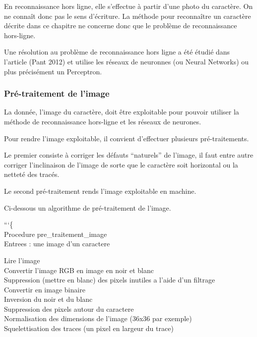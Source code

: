 \documentclass[
12pt,
french,
]{article}
\begin{document}
En reconnaissance hors ligne, elle s'effectue à partir d'une photo du
caractère. On ne connaît donc pas le sens d'écriture. La méthode pour
reconnaître un caractère décrite dans ce chapitre ne concerne donc que
le problème de reconnaissance hors-ligne.

Une résolution au problème de reconnaissance hors ligne a été étudié
dans l'article (Pant 2012) et utilise les réseaux de neuronnes (ou
Neural Networks) ou plus précisément un Perceptron.

\hypertarget{pruxe9-traitement-de-limage}{%
\subsubsection{Pré-traitement de
l'image}\label{pruxe9-traitement-de-limage}}

La donnée, l'image du caractère, doit être exploitable pour pouvoir
utiliser la méthode de reconnaissance hors-ligne et les réseaux de
neurones.

Pour rendre l'image exploitable, il convient d'effectuer plusieurs
pré-traitements.

Le premier consiste à corriger les défauts ``naturels'' de l'image, il
faut entre autre corriger l'inclinaison de l'image de sorte que le
caractère soit horizontal ou la netteté des tracés.

Le second pré-traitement rends l'image exploitable en machine.

Ci-dessous un algorithme de pré-traitement de l'image.

```\{\\
Procedure pre\_traitement\_image\\
Entrees : une image d'un caractere

Lire l'image\\
Convertir l'image RGB en image en noir et blanc\\
Suppression (mettre en blanc) des pixels inutiles a l'aide d'un
filtrage\\
Convertir en image binaire\\
Inversion du noir et du blanc\\
Suppression des pixels autour du caractere\\
Normalisation des dimensions de l'image (36x36 par exemple)\\
Squelettisation des traces (un pixel en largeur du trace)
\end{document}
